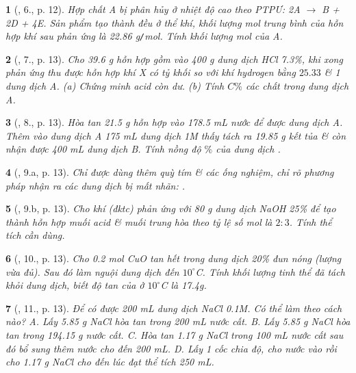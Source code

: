 \documentclass{article}
\newtheorem{baitoan}{}
\begin{document}
\begin{baitoan}[\cite{An_400_BT_Hoa_Hoc_9}, 6., p. 12]
	Hợp chất A bị phân hủy ở nhiệt độ cao theo {\rm PTPƯ: 2A $\to$ B + 2D + 4E}. Sản phẩm tạo thành đều ở thể khí, khối lượng mol trung bình của hỗn hợp khí sau phản ứng là {\rm22.86 g{\tt/}mol}. Tính khối lượng mol của A.
\end{baitoan}

\begin{baitoan}[\cite{An_400_BT_Hoa_Hoc_9}, 7., p. 13]
	Cho {\rm39.6 g} hỗn hợp gồm {\rm{}} vào {\rm400 g} dung dịch {\rm HCl 7.3\%}, khi xong phản ứng thu được hỗn hợp khí X có tỷ khối so với khí hydrogen bằng $25.33$ \& 1 dung dịch A. (a) Chứng minh acid còn dư. (b) Tính $C\%$ các chất trong dung dịch A.
\end{baitoan}

\begin{baitoan}[\cite{An_400_BT_Hoa_Hoc_9}, 8., p. 13]
	Hòa tan {\rm21.5 g} hỗn hợp {\rm{}} vào {\rm178.5 mL} nước để được dung dịch A. Thêm vào dung dịch A {\rm175 mL} dung dịch {\rm{} 1M} thấy tách ra {\rm19.85 g} kết tủa \& còn nhận được {\rm400 mL} dung dịch B. Tính nồng độ $\%$ của dung dịch {\rm{}}.
\end{baitoan}

\begin{baitoan}[\cite{An_400_BT_Hoa_Hoc_9}, 9.a, p. 13]
	Chỉ được dùng thêm quỳ tím \& các ống nghiệm, chỉ rõ phương pháp nhận ra các dung dịch bị mất nhãn: {\rm{}}.
\end{baitoan}

\begin{baitoan}[\cite{An_400_BT_Hoa_Hoc_9}, 9.b, p. 13]
	Cho khí {\rm{}} (đktc) phản ứng với {\rm80 g} dung dịch {\rm NaOH 25\%} để tạo thành hỗn hợp muối acid \& muối trung hòa theo tỷ lệ số mol là $2:3$. Tính thể tích {\rm{}} cần dùng.
\end{baitoan}

\begin{baitoan}[\cite{An_400_BT_Hoa_Hoc_9}, 10., p. 13]
	Cho {\rm0.2 mol CuO} tan hết trong dung dịch {\rm{} 20\%} đun nóng (lượng vừa đủ). Sau đó làm nguội dung dịch đến $10^\circ${\rm C}. Tính khối lượng tinh thể {\rm{}} đã tách khỏi dung dịch, biết độ tan của {\rm{}} ở $10^\circ${\rm C} là {\rm17.4g}.
\end{baitoan}

\begin{baitoan}[\cite{An_400_BT_Hoa_Hoc_9}, 11., p. 13]
	Để có được {\rm200 mL} dung dịch {\rm NaCl 0.1M}. Có thể làm theo cách nào? {\sf A.} Lấy {\rm5.85 g NaCl} hòa tan trong {\rm200 mL} nước cất. {\sf B.} Lấy {\rm5.85 g NaCl} hòa tan trong {\rm194.15 g} nước cất. {\sf C.} Hòa tan {\rm1.17 g NaCl} trong {\rm100 mL} nước cất sau đó bổ sung thêm nước cho đến {\rm200 mL}. {\sf D.} Lấy 1 cốc chia độ, cho nước vào rồi cho {\rm1.17 g NaCl} cho đến lúc đạt thể tích {\rm250 mL}.
\end{baitoan}
\end{document}
